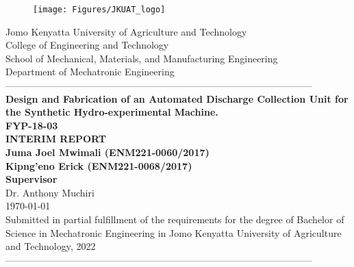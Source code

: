 \documentclass[12pt,fleqn]{article}
\begin{document}
\begin{titlepage}
  \begin{center}
      \vspace*{-4.0cm}
    \begin{figure}[!h]
\centering
\texttt{[image: Figures/JKUAT\_logo]}
\label{fig:jomologo}
\end{figure}
   \large{Jomo Kenyatta University of Agriculture and Technology}\\
    \large{College of Engineering and Technology}\\
    \large{School of Mechanical, Materials, and Manufacturing Engineering}\\
   \large{Department of Mechatronic Engineering}\\
    ------------------------------------------------------------------------------------------------\\[0.1cm]
    \LARGE{\textbf{Design and Fabrication of an Automated Discharge Collection Unit for the Synthetic Hydro-experimental Machine.}}\\[0.1cm]
    \LARGE{\textbf{FYP-18-03}}\\[0.4cm]
    \LARGE{\textbf{INTERIM REPORT}}\\[0.4cm]
    \large{\textbf{Juma Joel Mwimali (ENM221-0060/2017)}}\\
     \large{\textbf{Kipng'eno Erick (ENM221-0068/2017)}}\\[0.2cm]
     \large{\textbf{Supervisor}}\\
	\large{Dr. Anthony Muchiri}\\
    \large{\small{\monthyeardate\today}}\\
    \small{Submitted in partial fulfillment of the requirements for the degree of Bachelor of Science in Mechatronic Engineering in Jomo Kenyatta University of Agriculture and Technology, 2022}\\
    ------------------------------------------------------------------------------------------------\\[1.5cm]
  \end{center}
\end{titlepage}



\clearpage
\tableofcontents
\clearpage
{}
\let\oldnumberline\numberline%
\renewcommand{\numberline}{\figurename~\oldnumberline}%
\listoffigures
\clearpage
{}
\renewcommand{\numberline}{\tablename~\oldnumberline}%
\listoftables
\newpage
\clearpage
{}

\clearpage
\newpage
\end{document}
